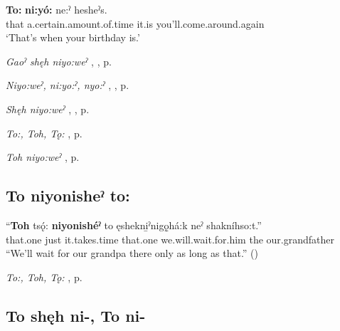\ea
\label{ex:tpart98}
\gll \textbf{To:} \textbf{ni:yó:} ne:ˀ hesheˀs.\\
that a.certain.amount.of.time it.is you’ll.come.around.again\\
\glt ‘That’s when your birthday is.’
\z

\largerpage
\begin{CayugaRelated}
\item \textit{Gaoˀ shęh niyo:weˀ} , , p. \pageref{p:[gaoˀ shęh niyo:weˀ]}\\
\item \textit{Niyo:weˀ, ni:yo:ˀ, nyo:ˀ} , , p. \pageref{p:[niyo:weˀ]}\\
\item \textit{Shęh niyo:weˀ} , , p. \pageref{p:[shęh niyo:weˀ]}\\
\item \textit{To:, Toh, Tǫ:} , p. \pageref{p:[to:] ‘that one’}\\
\item \textit{Toh niyo:weˀ} , p. \pageref{p:[toh niyo:weˀ]}
\end{CayugaRelated}


\subsection*{\textbf{To niyonisheˀ to:} } \label{p:[to: niyonisheˀ to:]}

\ea
\label{ex:tpart99}
\gll “\textbf{Toh} tsǫ́: \textbf{niyonishéˀ} to ęshekni̱ˀnigǫ̱há:k neˀ shakníhso:t.”\\
that.one just it.takes.time that.one we.will.wait.for.him the our.grandfather\\
\glt “We’ll wait for our grandpa there only as long as that.” (\cite{henry_de_2005})
\z

\begin{CayugaRelated}
\item \textit{To:, Toh, Tǫ:} , p. \pageref{p:[to:] ‘that one’}
\end{CayugaRelated}


\subsection*{\textbf{To shęh ni-, To ni-} } \label{p:[toh shęh ni-]}

